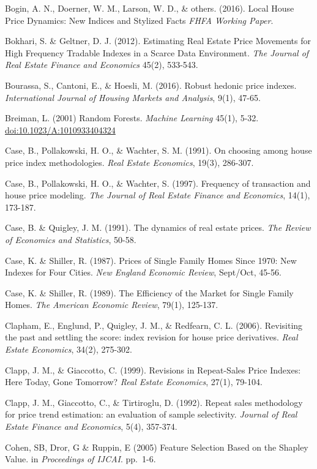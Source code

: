 \documentclass[
]{article}
\begin{document}
Bogin, A. N., Doerner, W. M., Larson, W. D., \& others. (2016). Local
House Price Dynamics: New Indices and Stylized Facts \emph{FHFA Working
Paper}.

Bokhari, S. \& Geltner, D. J. (2012). Estimating Real Estate Price
Movements for High Frequency Tradable Indexes in a Scarce Data
Environment. \emph{The Journal of Real Estate Finance and Economics}
45(2), 533-543.

Bourassa, S., Cantoni, E., \& Hoesli, M. (2016). Robust hedonic price
indexes. \emph{International Journal of Housing Markets and Analysis},
9(1), 47-65.

Breiman, L. (2001) Random Forests. \emph{Machine Learning} 45(1), 5-32.
\href{https://link.springer.com/article/10.1023/A:1010933404324}{doi:10.1023/A:1010933404324}

Case, B., Pollakowski, H. O., \& Wachter, S. M. (1991). On choosing
among house price index methodologies. \emph{Real Estate Economics},
19(3), 286-307.

Case, B., Pollakowski, H. O., \& Wachter, S. (1997). Frequency of
transaction and house price modeling. \emph{The Journal of Real Estate
Finance and Economics}, 14(1), 173-187.

Case, B. \& Quigley, J. M. (1991). The dynamics of real estate prices.
\emph{The Review of Economics and Statistics}, 50-58.

Case, K. \& Shiller, R. (1987). Prices of Single Family Homes Since
1970: New Indexes for Four Cities. \emph{New England Economic Review},
Sept/Oct, 45-56.

Case, K. \& Shiller, R. (1989). The Efficiency of the Market for Single
Family Homes. \emph{The American Economic Review}, 79(1), 125-137.

Clapham, E., Englund, P., Quigley, J. M., \& Redfearn, C. L. (2006).
Revisiting the past and settling the score: index revision for house
price derivatives. \emph{Real Estate Economics}, 34(2), 275-302.

Clapp, J. M., \& Giaccotto, C. (1999). Revisions in Repeat-Sales Price
Indexes: Here Today, Gone Tomorrow? \emph{Real Estate Economics}, 27(1),
79-104.

Clapp, J. M., Giaccotto, C., \& Tirtiroglu, D. (1992). Repeat sales
methodology for price trend estimation: an evaluation of sample
selectivity. \emph{Journal of Real Estate Finance and Economics}, 5(4),
357-374.

Cohen, SB, Dror, G \& Ruppin, E (2005) Feature Selection Based on the
Shapley Value. in \emph{Proceedings of IJCAI}. pp.~1-6.
\end{document}
